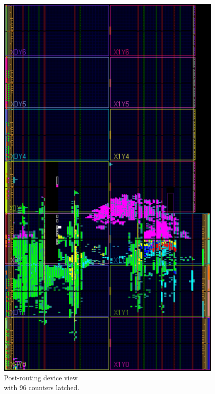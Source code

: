 \begin{figure}[H]
	\centering
	\begin{minipage}{.5\textwidth}
		\centering
		\includegraphics[width=.85\linewidth]{IMG/ch4/routed_colored_counters_clocks}
		\caption{Post-routing device view\\ with 96 counters latched.}
		\label{fig:counters_clocks}
	\end{minipage}%
	\begin{minipage}{.5\textwidth}
		\centering

\end{minipage}
\end{figure}
